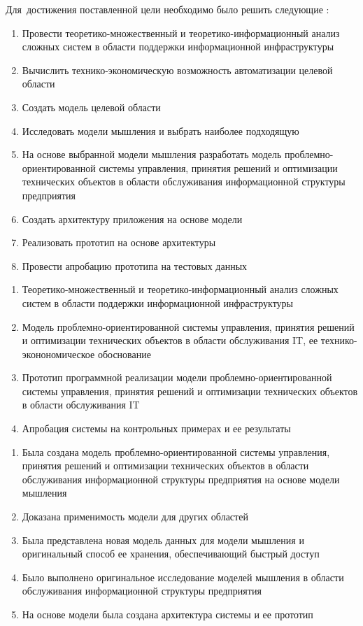 Для~достижения поставленной цели необходимо было решить следующие {\tasks}:
\begin{enumerate}
  \item Провести теоретико-множественный и теоретико-информационный анализ сложных систем в области поддержки информационной инфраструктуры
  \item Вычислить технико-экономическую возможность автоматизации целевой области
  \item Создать модель целевой области
  \item Исследовать модели мышления и выбрать наиболее подходящую
  \item На основе выбранной модели мышления разработать модель проблемно-ориентированной системы управления, принятия решений и оптимизации технических объектов в области обслуживания информационной структуры предприятия
  \item Создать архитектуру приложения на основе модели
  \item Реализовать прототип на основе архитектуры
  \item Провести апробацию прототипа на тестовых данных
\end{enumerate}

\begin{enumerate}
  \item Теоретико-множественный и теоретико-информационный анализ сложных систем в области поддержки информационной инфраструктуры
  \item Модель проблемно-ориентированной системы управления, принятия решений и оптимизации технических объектов в области обслуживания IT, ее технико-эконономическое обоснование  
  \item Прототип программной реализации модели проблемно-ориентированной системы управления, принятия решений и оптимизации технических объектов в области обслуживания IT  
  \item Апробация системы на контрольных примерах и ее результаты
\end{enumerate}

\novelty
\begin{enumerate}
  \item Была создана модель проблемно-ориентированной системы управления, принятия решений и оптимизации технических объектов в области обслуживания информационной структуры предприятия на основе модели мышления
  \item Доказана применимость модели для других областей
  \item Была представлена новая модель данных для модели мышления и оригинальный способ ее хранения, обеспечивающий быстрый доступ
  \item Было выполнено оригинальное исследование моделей мышления в области обслуживания информационной структуры предприятия
  \item На основе модели была создана архитектура системы и ее прототип 
\end{enumerate}

